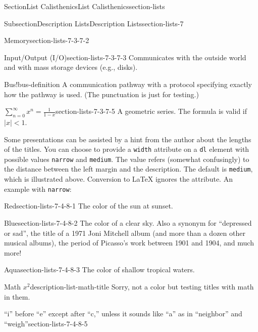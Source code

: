 \documentclass[twoside,10pt,]{article}
\newcommand{\mono}[1]{\texttt{#1}}
\numberwithin{equation}{section}
\begin{document}
\begin{sectionptx}{Section}{List Calisthenics}{}{List Calisthenics}{}{}{section-lists}
\begin{subsectionptx}{Subsection}{Description Lists}{}{Description Lists}{}{}{section-lists-7}
\begin{descriptionlist}
\begin{dlimedium}{Memory}{section-lists-7-3-7-2}
\end{dlimedium}%
\begin{dlimedium}{Input\slash{}Output (I\slash{}O)}{section-lists-7-3-7-3}%
Communicates with the outside world and with mass storage devices (e.g.\@, disks).%
\end{dlimedium}%
\begin{dlimedium}{Bus!}{bus-definition}%
A communication pathway with a protocol specifying exactly how the pathway is used. (The punctuation is just for testing.)%
\end{dlimedium}%
\begin{dlimedium}{\(\displaystyle \sum_{n=0}^\infty x^n = \frac{1}{1-x}\)}{section-lists-7-3-7-5}%
A geometric series.  The formula is valid if \(|x| < 1\).%
\end{dlimedium}%
\end{descriptionlist}
%
\par
Some presentations can be assisted by a hint from the author about the lengths of the titles.  You can choose to provide a \mono{width} attribute on a \mono{dl} element with possible values \mono{narrow} and \mono{medium}. The value refers (somewhat confusingly) to the distance between the left margin and the description.  The default is \mono{medium}, which is illustrated above. Conversion to \LaTeX{} ignores the attribute.  An example with \mono{narrow}:%
\begin{descriptionlist}
\begin{dlinarrow}{Red}{section-lists-7-4-8-1}%
The color of the sun at sunset.%
\end{dlinarrow}%
\begin{dlinarrow}{Blue}{section-lists-7-4-8-2}%
The color of a clear sky. Also a synonym for ``depressed or sad'', the title of a 1971 Joni Mitchell album (and more than a dozen other musical albums), the period of Picasso's work between 1901 and 1904, and much more!%
\end{dlinarrow}%
\begin{dlinarrow}{Aqua}{section-lists-7-4-8-3}%
The color of shallow tropical waters.\footnotemark{}%
\end{dlinarrow}%
%
\begin{dlinarrow}{Math \(x^2\)}{description-list-math-title}%
Sorry, not a color but testing titles with math in them.%
\end{dlinarrow}%
\begin{dlinarrow}{``i'' before ``e'' except after ``c,'' unless it sounds like ``a'' as in ``neighbor'' and ``weigh''}{section-lists-7-4-8-5}%

\end{dlinarrow}
\end{descriptionlist}
\end{subsectionptx}
\end{sectionptx}
\end{document}
